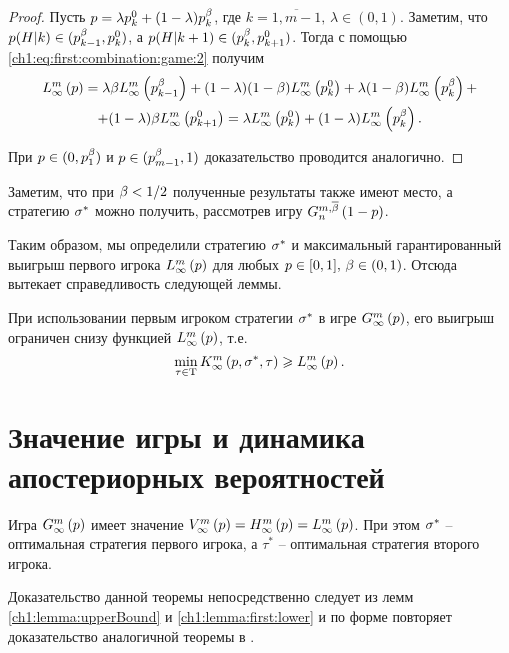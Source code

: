 {\begin{proof}
  Пусть $p = \lambda\pEven + (1-\lambda)\pOdd$, где %
  $k = \overline{1, m - 1}, \, \lambda \in (0, 1)$. Заметим, что %
  $p(H|k) \in ( \pOdd[k-1], \pEven )$, а %
  $p(H|k+1) \in ( \pOdd, \pEven[k+1] )$. Тогда с помощью
  \eqref{ch1:eq:first:combination:game:2} получим
  \begin{multline*}
    \lowerBound{p} =
    \lambda \Co \lowerBound{\pOdd[k-1]} + 
    (1-\lambda)(1-\Co)\lowerBound{\pEven} + \lambda(1-\Co)\lowerBound{\pOdd} + \\
    + (1-\lambda)\Co\lowerBound{\pEven[k+1]} 
    = \lambda \lowerBound{\pEven} + (1-\lambda) \lowerBound{\pOdd}.
  \end{multline*}
  
  При $p \in ( 0, \pOdd[1] )$ и $p \in ( \pOdd[m-1], 1 )$ доказательство
  проводится аналогично.
\end{proof}

Заметим, что при $\Co < 1/2$ полученные результаты также имеют место, а
стратегию $\fOpt$ можно получить, рассмотрев игру $\symmGameExpression[n]{1-p}$.

Таким образом, мы определили стратегию $\fOpt$ и максимальный гарантированный
выигрыш первого игрока $\lowerBound{p}$ для любых %
$p \in [0, 1], \, \Co \in (0, 1)$. Отсюда вытекает справедливость следующей
леммы.

\begin{lemma}
  \label{ch1:lemma:first:lower}
  При использовании первым игроком стратегии $\fOpt$ в игре
  $\infiniteGame{p}$\textup{,} его выигрыш ограничен снизу функцией
  $\lowerBound{p}$\textup{,} т.е.
  \[
    \min_{\tau \in \Tau} \infiniteFirstPlayerPayoff{p}{\fOpt}{\tau} \geq
    \lowerBound{p}.
  \]
\end{lemma}


\section{Значение игры и динамика апостериорных вероятностей}\label{ch1:game-value}

\begin{theorem}
  Игра $\infiniteGame{p}$ имеет значение $\infiniteGameValue{p} = \upperBound{p}
  = \lowerBound{p}$. При этом $\fOpt$ -- оптимальная стратегия первого
  игрока\textup{,} а $\tau^*$ -- оптимальная стратегия второго игрока.
\end{theorem}
Доказательство данной теоремы непосредственно следует из лемм
\ref{ch1:lemma:upperBound} и \ref{ch1:lemma:first:lower} и по форме повторяет
доказательство аналогичной теоремы в \cite{domansky07}.

}
